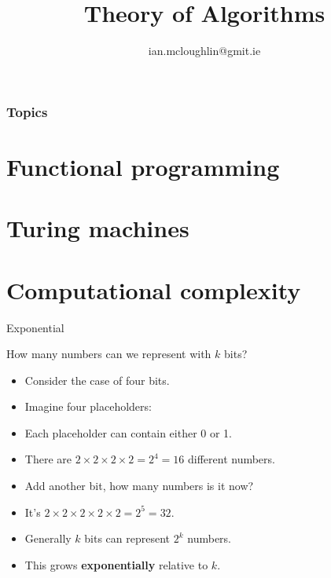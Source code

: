 


\title{Theory of Algorithms}
\subtitle{}
\author{ian.mcloughlin@gmit.ie}
\date{}


\begin{frame}
  \titlepage
\end{frame}

\begin{frame}
  \frametitle{Topics}
  \tableofcontents
\end{frame}



\section{Functional programming}


\section{Turing machines}

\section{Computational complexity}


\begin{frame}[fragile]{Exponential}
  \begin{exampleblock}{How many numbers can we represent with $k$ bits?}
    \begin{itemize}
      \item Consider the case of four bits.
      \item Imagine four placeholders:  \textbf{}\textbf{}\textbf{}\textbf{}
      \item Each placeholder can contain either 0 or 1.
      \item There are $2 \times 2 \times 2 \times 2 = 2^4 = 16$ different numbers.
      \item Add another bit, how many numbers is it now?
      \item It's $2 \times 2 \times 2 \times 2 \times 2 = 2^5 = 32$.
      \item Generally $k$ bits can represent $2^k$ numbers.
      \item This grows \textbf{exponentially} relative to $k$.
    \end{itemize}
  \end{exampleblock}
\end{frame}


